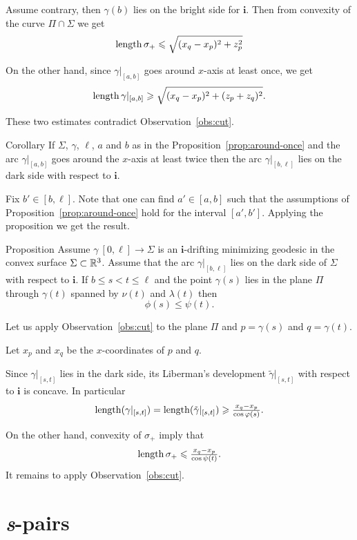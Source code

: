 \documentclass[a4paper,10pt]{amsart}
\begin{document}
Assume contrary,
then $\gamma(b)$ lies on the bright side for $\bm{i}$.
Then from convexity of the curve $\Pi\cap \Sigma$
we get 
\[\mathop{\rm length}\nolimits\sigma_+\leqslant \sqrt{(x_q-x_p)^2+z_p^2}\]

On the other hand, since $\gamma|_{[a,b]}$ goes around $x$-axis at least once,
we get 
\[\mathop{\rm length}\nolimits\gamma|_{[a,b]}\geqslant \sqrt{(x_q-x_p)^2+(z_p+z_q)^2}.\]

These two estimates contradict Observation~\ref{obs:cut}.
\qeds

\begin{thm}{Corollary}\label{cor:around-twice}
If $\Sigma$, $\gamma$, $\ell$, $a$ and $b$ as in the Proposition~\ref{prop:around-once} and the arc $\gamma|_{[a,b]}$ goes around the $x$-axis at least twice
then the arc $\gamma|_{[b,\ell]}$ lies on the dark side with respect to $\bm{i}$.
\end{thm}

Fix $b'\in [b,\ell]$.
Note that one can find $a'\in [a,b]$ 
such that the assumptions of Proposition~\ref{prop:around-once} hold for the interval $[a',b']$. 
Applying the proposition we get the result.
\qeds 


\begin{thm}{Proposition}\label{prop:phi-psi}
Assume $\gamma\:[0,\ell]\to \Sigma$ is an $\bm{i}$-drifting minimizing geodesic 
in the convex surface $\Sigma\subset \mathbb{R}^3$.
Assume that the arc $\gamma|_{[b,\ell]}$ 
lies on the dark side of $\Sigma$ with respect to $\bm{i}$.
If $b\le s<t\le \ell$ and the point $\gamma(s)$ lies in the plane $\Pi$ through $\gamma(t)$ spanned by $\nu(t)$ and $\lambda(t)$
then 
\[\phi(s)\le \psi(t).\]
\end{thm}

Let us apply Observation~\ref{obs:cut} to the plane $\Pi$ and $p=\gamma(s)$ and $q=\gamma(t)$.

Let $x_p$ and $x_q$ be the $x$-coordinates of $p$ and $q$.

Since $\gamma|_{[s,t]}$ lies in the dark side,
its Liberman's development $\tilde\gamma|_{[s,t]}$ 
with respect to $\bm{i}$ is concave.
In particular 
\[\mathop{\rm length}\nolimits(\gamma|_{[s,t]})
=
\mathop{\rm length}\nolimits(\tilde\gamma|_{[s,t]})
\geqslant
\tfrac{x_q-x_p}{\cos\varphi(s)}.\]

On the other hand, convexity of $\sigma_+$ imply that
\[\mathop{\rm length}\nolimits\sigma_+\leqslant \tfrac{x_q-x_p}{\cos\psi(t)}.\]
It remains to apply Observation~\ref{obs:cut}.
\qeds

\section{\textit{s}-pairs}
\end{document}

